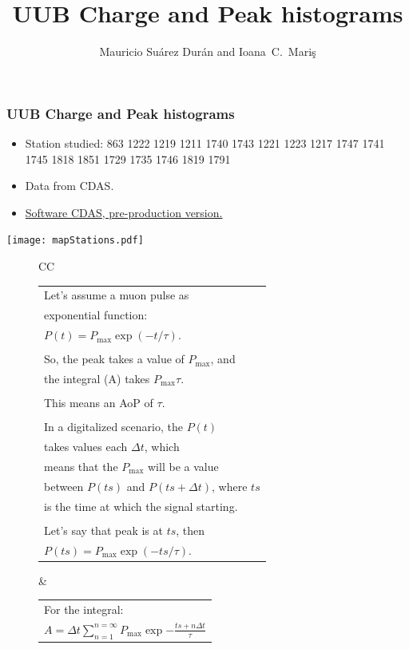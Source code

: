 \documentclass[aspectratio=169]{beamer}
\title{UUB Charge and Peak histograms}
\author{
  Mauricio Su\'arez Dur\'an and Ioana~C.~Mari\c{s}
}
\institute{IIHE-ULB}
\begin{document}
\begin{frame}
  \titlepage
\end{frame}


\begin{frame}
	\frametitle{UUB Charge and Peak histograms}
	\begin{itemize}
		\item Station studied: 863 1222 1219 1211 1740 1743 1221 1223 1217 1747 1741 1745 1818 1851 1729 1735 1746 1819 1791
		\item Data from CDAS.
		\item {\underline {Software CDAS, pre-production version.}}
	\end{itemize}
	\centering
	\texttt{[image: mapStations.pdf]}
\end{frame}


\begin{frame}
  \begin{figure}
    \centering
    \begin{tabularx}{\textwidth}{CC}
      \begin{tabular}{l}
        Let's assume a muon pulse as \\
        exponential function: \\
        $P(t) = P_{\mathrm{max}}\exp(-t/\tau)$. \\ \\
        
        So, the peak takes a value of $P_{\mathrm{max}}$, and \\
        the integral (A) takes $P_{\mathrm{max}}\tau$. \\ \\

        This means an AoP of $\tau$. \\ \\

        In a digitalized scenario, the $P(t)$ \\
        takes values each $\Delta t$, which \\
        means that the $P_{\mathrm{max}}$ will be a value \\
        between $P(ts)$ and $P(ts + \Delta t)$, where $ts$ \\
        is the time at which the signal starting. \\ \\
        Let's say that peak is at $ts$, then \\
        $P(ts) = P_{\mathrm{max}}\exp(-ts/\tau)$. \\
      \end{tabular}
      &
      \begin{tabular}{l}
        For the integral: \\
        $A = \Delta t \sum_{n=1}^{n=\infty} 
        P_{\mathrm{max}}\exp{-\frac{ts + n\Delta t}{\tau}}$ \\


\end{tabular}
\end{tabularx}
\end{figure}
\end{frame}
\end{document}
